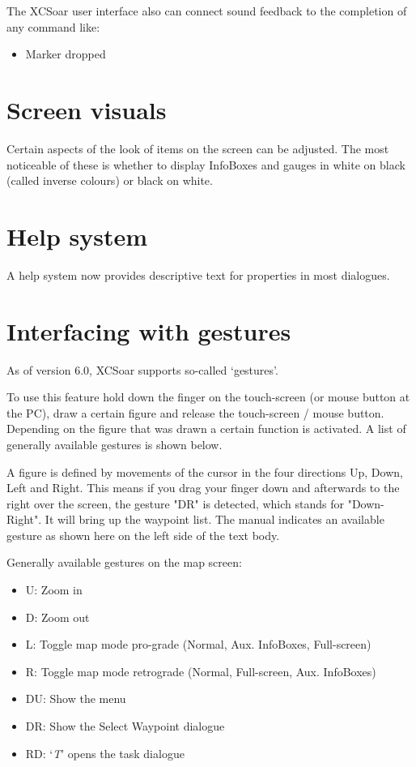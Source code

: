 The XCSoar user interface also can connect sound feedback to the completion 
of any command like:
\begin{itemize}
\item Marker dropped
\end{itemize}


\section{Screen visuals}

Certain aspects of the look of items on the screen can be adjusted.
The most noticeable of these is whether to display InfoBoxes and
gauges in white on black (called inverse colours) or black on white.


\section{Help system}

A help system now provides descriptive text for properties in
most dialogues.

\section{Interfacing with gestures}\label{sec:gestures}
As of version 6.0, XCSoar supports so-called `gestures'.

To use this feature hold down the finger on the 
touch-screen (or mouse button at the PC), draw a certain figure and release 
the touch-screen / mouse button. Depending on the figure that was drawn 
a certain function is activated. A list of generally available gestures is 
shown below. 

A figure is defined by movements of the 
cursor in the four directions Up, Down, Left and Right. This means if 
you drag your finger down and afterwards to the right over the screen, 
 the gesture "DR" is detected, which stands for "Down-Right". 
It will bring up the waypoint list. The manual indicates an available 
gesture as shown here on the left side of the text body.

Generally available gestures on the map screen:
\begin{itemize}
\item U: Zoom in
\item D: Zoom out
\item L: Toggle map mode pro-grade (Normal, Aux. InfoBoxes, Full-screen)
\item R: Toggle map mode retrograde (Normal, Full-screen, Aux. InfoBoxes)
\item DU: Show the menu
\item DR: Show the Select Waypoint dialogue
\item RD: `{\it T}' opens the task dialogue
\end{itemize}

